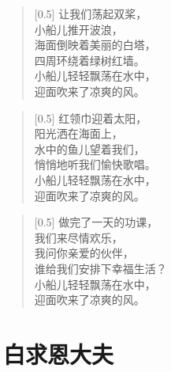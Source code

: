 \documentclass[12pt,UTF-8,openany]{ctexbook}
\begin{document}
\begin{large}
    
    \begin{verse}[0.5\linewidth]
        让我们荡起双桨， \\
        小船儿推开波浪， \\
        海面倒映着美丽的白塔， \\
        四周环绕着绿树红墙。 \\
        小船儿轻轻飘荡在水中， \\
        迎面吹来了凉爽的风。
    \end{verse}
    
    
    \begin{verse}[0.5\linewidth]
        红领巾迎着太阳， \\
        阳光洒在海面上， \\
        水中的鱼儿望着我们， \\
        悄悄地听我们愉快歌唱。 \\
        小船儿轻轻飘荡在水中， \\
        迎面吹来了凉爽的风。
    \end{verse}
    
    
    \begin{verse}[0.5\linewidth]
        做完了一天的功课， \\
        我们来尽情欢乐， \\
        我问你亲爱的伙伴， \\
        谁给我们安排下幸福生活？ \\
        小船儿轻轻飘荡在水中， \\
        迎面吹来了凉爽的风。
    \end{verse}
    
\end{large}



\chapter{白求恩大夫}
\end{document}
